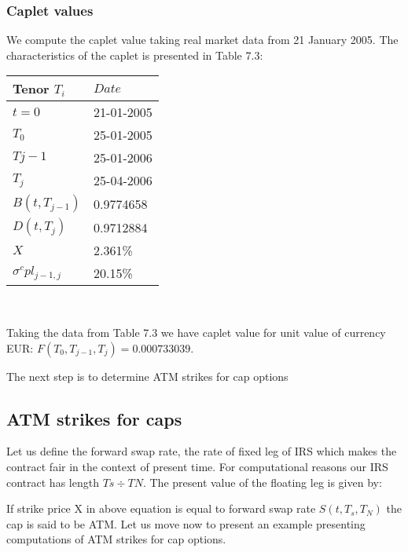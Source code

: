 \documentclass[11pt]{article}
\numberwithin{equation}{subsection}
\begin{document}
\subsubsection{Caplet values}
We compute the caplet value taking real market data from 21 January 2005. The characteristics
of the caplet is presented in Table 7.3:
\vskip 0.2cm 		
{
	\centering
	\begin{tabular}{|l|l|}
		\hline
		Tenor \(T_i\) & \(Date\) \\		
		\hline
		\(t=0\)   &  21-01-2005 \\
		\hline		
		\(T_0\)    &  25-01-2005 \\
		\hline		
		\(T{j−1}\)  &  25-01-2006 \\
		\hline		
		\(T_j\)   &  25-04-2006 \\
		\hline		
		\(B(t, T_{j−1})\)  &  0.9774658 \\
		\hline		
		\(D(t, T_{j})\)    &  0.9712884 \\
		\hline		
		\(X\)  			   &  2.361\%  \\
		\hline				
		\(\sigma^cpl_{j-1, j}\)  &  20.15\% \\
		\hline				 				
	\end{tabular}
}

\vskip 0.4cm\

Taking the data from Table 7.3 we have caplet value for unit value of currency EUR: \(F(T_{0}, T_{j-1}, T_{j})=0.000733039\).

The next step is to determine ATM strikes for cap options

\subsection{ATM strikes for caps}

Let us define the forward swap rate, the rate of fixed leg of IRS which makes the contract
fair in the context of present time. For computational reasons our IRS contract has length
\(Ts÷TN\). The present value of the floating leg is given by:


If strike price X in above equation is equal to forward swap rate \(S(t, T_s, T_N)\) the cap is
said to be ATM. Let us move now to present an example presenting computations of ATM
strikes for cap options.
\end{document}
